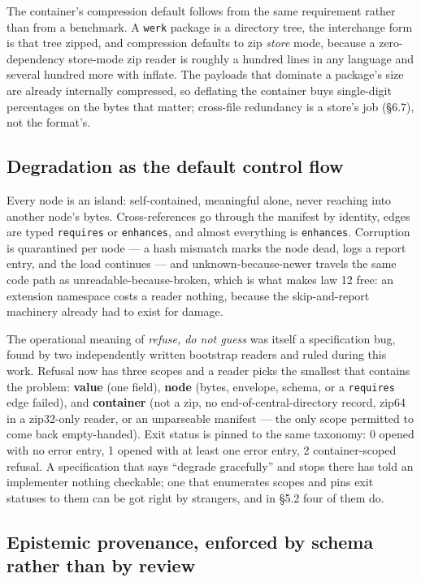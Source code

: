 \documentclass[10pt,twocolumn,letterpaper]{article}
\newcommand{\code}[1]{\texttt{\small #1}}
\begin{document}
The container's compression default follows from the same requirement rather than from a benchmark. A \code{werk} package is a directory tree, the interchange form is that tree zipped, and compression defaults to zip \emph{store} mode, because a zero-dependency store-mode zip reader is roughly a hundred lines in any language and several hundred more with inflate. The payloads that dominate a package's size are already internally compressed, so deflating the container buys single-digit percentages on the bytes that matter; cross-file redundancy is a store's job (\S6.7), not the format's.

\subsection{Degradation as the default control flow}

Every node is an island: self-contained, meaningful alone, never reaching into another node's bytes. Cross-references go through the manifest by identity, edges are typed \code{requires} or \code{enhances}, and almost everything is \code{enhances}. Corruption is quarantined per node --- a hash mismatch marks the node dead, logs a report entry, and the load continues --- and unknown-because-newer travels the same code path as unreadable-because-broken, which is what makes law 12 free: an extension namespace costs a reader nothing, because the skip-and-report machinery already had to exist for damage.

The operational meaning of \emph{refuse, do not guess} was itself a specification bug, found by two independently written bootstrap readers and ruled during this work. Refusal now has three scopes and a reader picks the smallest that contains the problem: \textbf{value} (one field), \textbf{node} (bytes, envelope, schema, or a \code{requires} edge failed), and \textbf{container} (not a zip, no end-of-central-directory record, zip64 in a zip32-only reader, or an unparseable manifest --- the only scope permitted to come back empty-handed). Exit status is pinned to the same taxonomy: 0 opened with no error entry, 1 opened with at least one error entry, 2 container-scoped refusal. A specification that says ``degrade gracefully'' and stops there has told an implementer nothing checkable; one that enumerates scopes and pins exit statuses to them can be got right by strangers, and in \S5.2 four of them do.

\subsection{Epistemic provenance, enforced by schema rather than by review}
\end{document}
